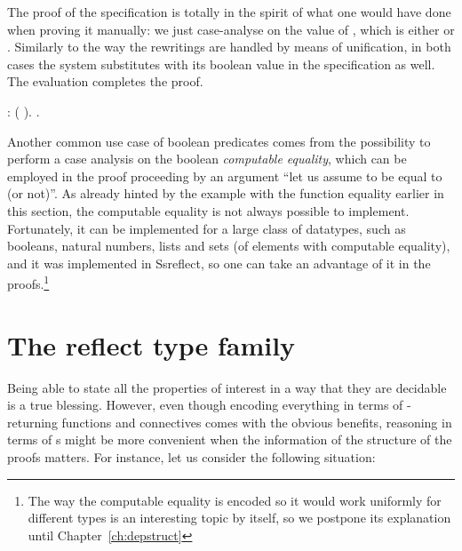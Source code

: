The proof of the specification is totally in the spirit of what one
would have done when proving it manually: we just case-analyse on the
value of  , which is either  or . Similarly to
the way the rewritings are handled by means of unification, in both
cases the system substitutes   with its boolean value in the
specification as well. The evaluation completes the proof.


\begin{coqdoccode}
\coqdocemptyline
\coqdocnoindent
{} : ( ).\coqdoceol
\coqdocnoindent
{}.\coqdoceol
\coqdocemptyline
\end{coqdoccode}


Another common use case of boolean predicates comes from the
possibility to perform a case analysis on the boolean \textit{computable
equality}, which can be employed in the proof proceeding by an
argument ``let us assume  to be equal to  (or not)''. As already
hinted by the example with the function equality earlier in this
section, the computable equality is not always possible to
implement. Fortunately, it can be implemented for a large class of
datatypes, such as booleans, natural numbers, lists and sets (of
elements with computable equality), and it was implemented in
Ssreflect, so one can take an advantage of it in the
proofs.\footnote{The way the computable equality is encoded so it
would work uniformly for different types is an interesting topic by
itself, so we postpone its explanation until
Chapter~\ref{ch:depstruct}}




\section{The \textsf{\textbf{reflect}} type family}


\label{sec:reflect}


Being able to state all the properties of interest in a way that they
are decidable is a true blessing. However, even though encoding
everything in terms of -returning functions and connectives
comes with the obvious benefits, reasoning in terms of s might
be more convenient when the information of the structure of the proofs
matters. For instance, let us consider the following situation:


